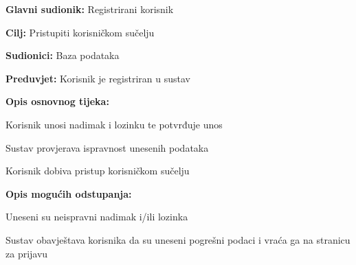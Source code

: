 				\noindent {}
				\begin{packed_item}
					
					\item \textbf{Glavni sudionik:} Registrirani korisnik
					\item  \textbf{Cilj:} Pristupiti korisničkom sučelju
					\item  \textbf{Sudionici:} Baza podataka
					\item  \textbf{Preduvjet:} Korisnik je registriran u sustav
					\item  \textbf{Opis osnovnog tijeka:}
					
					\item[] \begin{packed_enum}
						
						\item Korisnik unosi nadimak i lozinku te potvrđuje unos
						\item Sustav provjerava ispravnost unesenih podataka
						\item Korisnik dobiva pristup korisničkom sučelju
					\end{packed_enum}
					
					\item  \textbf{Opis mogućih odstupanja:}
					
					\item[] \begin{packed_item}
						
						\item[2.a] Uneseni su neispravni nadimak i/ili lozinka 
						\item[] \begin{packed_enum}
							
							\item Sustav obavještava korisnika da su uneseni pogrešni podaci i vraća ga na stranicu za prijavu			
						\end{packed_enum}			
					\end{packed_item}
				\end{packed_item}
				
